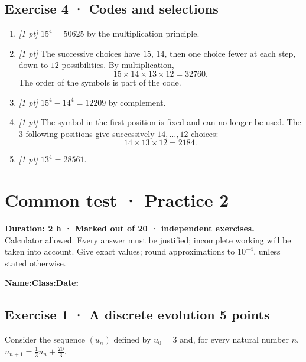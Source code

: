 \subsection*{Exercise 4 · Codes and selections}\begin{enumerate}

\item \textit{[1 pt]} $15^4=50625$ by the multiplication principle.

\item \textit{[1 pt]} The successive choices have $15$, $14$, then one choice fewer at each step, down to $12$ possibilities. By multiplication,
\[15\times14\times13\times12=32760.\]
The order of the symbols is part of the code.

\item \textit{[1 pt]} $15^4-14^4=12209$ by complement.

\item \textit{[1 pt]} The symbol in the first position is fixed and can no longer be used. The $3$ following positions give successively $14,\ldots,12$ choices:
\[14\times13\times12=2184.\]

\item \textit{[1 pt]} $13^4=28561$.

\end{enumerate}

\fi

\mxnewpage{}\label{sujet:3-2}

\section*{Common test · Practice 2}


\textbf{Duration: 2 h · Marked out of 20 ·  independent exercises.}\\Calculator allowed. Every answer must be justified; incomplete working will be taken into account. Give exact values; round approximations to $10^{-4}$, unless stated otherwise.

\smallskip\textbf{Name:}\enspace\dotfill\quad\textbf{Class:}\enspace\dotfill\quad\textbf{Date:}\enspace\dotfill

\subsection*{Exercise 1 · A discrete evolution \hfill 5 points}Consider the sequence $(u_n)$ defined by $u_0=3$ and, for every natural number $n$, $u_{n+1}=\frac{1}{3}u_n+\frac{20}{3}$.

